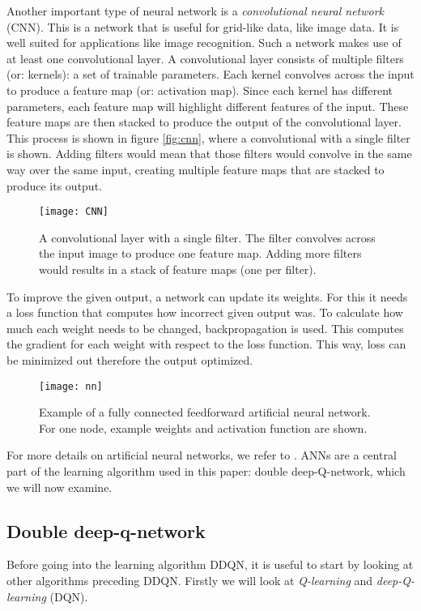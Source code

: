 Another important type of neural network is a \emph{convolutional neural network} (CNN). This is a network that is useful for grid-like data, like image data. It is well suited for applications like image recognition. Such a network makes use of at least one convolutional layer. A convolutional layer consists of multiple filters (or: kernels): a set of trainable parameters. Each kernel convolves across the input to produce a feature map (or: activation map). Since each kernel has different parameters, each feature map will highlight different features of the input. These feature maps are then stacked to produce the output of the convolutional layer. This process is shown in figure \ref{fig:cnn}, where a convolutional with a single filter is shown. Adding filters would mean that those filters would convolve in the same way over the same input, creating multiple feature maps that are stacked to produce its output.

\begin{figure}[h]
    \centering
    \texttt{[image: CNN]}
    \caption{A convolutional layer with a single filter. The filter convolves across the input image to produce one feature map. Adding more filters would results in a stack of feature maps (one per filter).}
    \label{fig:nn}
\end{figure}

To improve the given output, a network can update its weights. For this it needs a loss function that computes how incorrect given output was. To calculate how much each weight needs to be changed, backpropagation is used. This computes the gradient for each weight with respect to the loss function. This way, loss can be minimized out therefore the output optimized.

\begin{figure}[h]
    \centering
    \texttt{[image: nn]}
    \caption{Example of a fully connected feedforward artificial neural network. For one node, example weights and activation function are shown.}
    \label{fig:nn}
\end{figure}

For more details on artificial neural networks, we refer to \cite{nn}. ANNs are a central part of the learning algorithm used in this paper: double deep-Q-network, which we will now examine.

\subsection{Double deep-q-network}\label{pl-dqn}
Before going into the learning algorithm DDQN, it is useful to start by looking at other algorithms preceding DDQN. Firstly we will look at \emph{Q-learning} and \emph{deep-Q-learning} (DQN). 

